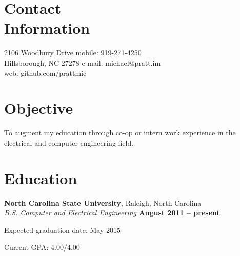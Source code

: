 \documentclass[margin,line,letterpaper]{resume}
\begin{document}
\begin{resume}

    \section{\mysidestyle Contact\\Information}

    2106 Woodbury Drive             \hfill mobile: 919-271-4250          \vspace{0mm}\\\vspace{0mm}%
    Hillsborough, NC 27278          \hfill e-mail: michael@pratt.im      \vspace{0mm}\\\vspace{0mm}%
                                    \hfill web: github.com/prattmic      \vspace{0mm}\\\vspace{-4.5mm}%


    \section{\mysidestyle Objective}

    To augment my education through co-op or intern work experience
    in the electrical and computer engineering field.


    \section{\mysidestyle Education}

    \textbf{North Carolina State University}, Raleigh, North Carolina \vspace{2mm}\\\vspace{1mm}%
    \textsl{B.S. Computer and Electrical Engineering} \hfill \textbf{ August 2011 -- present}\vspace{-3mm}\\\vspace{-1mm}%
    \begin{list2}
        \item Expected graduation date: May 2015
        \item Current GPA: 4.00/4.00
    \end{list2}\vspace{-1.5mm}



\end{resume}
\end{document}
